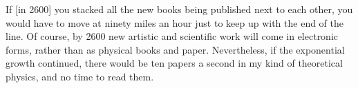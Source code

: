If [in 2600] you stacked all the new books being published next to
each other, you would have to move at ninety miles an hour just to
keep up with the end of the line. Of course, by 2600 new artistic
and scientific work will come in electronic forms, rather than as
physical books and paper. Nevertheless, if the exponential growth
continued, there would be ten papers a second in my kind of
theoretical physics, and no time to read them.
